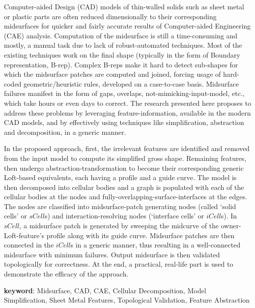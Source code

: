 

Computer-aided Design (CAD) models of thin-walled solids such as sheet metal or plastic parts are often reduced dimensionally to their corresponding midsurfaces for quicker and fairly accurate results of Computer-aided Engineering (CAE) analysis. Computation of the midsurface is still a time-consuming and mostly, a manual task due to lack of robust-automated techniques. Most of the existing techniques work on the final shape (typically in the form of Boundary representation, B-rep). Complex B-reps make it hard to detect sub-shapes for which the midsurface patches are computed and joined, forcing usage of hard-coded geometric/heuristic rules, developed on a case-to-case basis. Midsurface failures manifest in the form of gaps, overlaps, not-mimicking-input-model, etc., which take hours or even days to correct.  The research presented here proposes to address these problems by leveraging feature-information, available in the modern CAD models,         and by effectively using techniques like simplification, abstraction and decomposition, in a generic manner. 

In the proposed approach, first, the irrelevant features are identified and removed from the input model to compute its simplified gross shape. Remaining features, then undergo abstraction-transformation to become their corresponding generic Loft-based equivalents, each having a profile and a guide curve. The model is then decomposed into cellular bodies and a graph is populated with each of the cellular bodies at the nodes and fully-overlapping-surface-interfaces at the edges. The nodes are classified into midsurface-patch generating nodes (called `solid cells' or $sCell$s) and interaction-resolving nodes (`interface cells' or $iCell$s). In $sCell$, a midsurface patch is generated by sweeping the midcurve of the owner-Loft-feature's profile along with its guide curve. Midsurface patches are then connected in the $iCell$s in a generic manner, thus resulting in a well-connected midsurface with minimum failures. Output midsurface is then validated topologically for correctness. At the end, a practical, real-life part is used to demonstrate the efficacy of the approach.

\vspace{0.25cm}

\textbf{keyword}: Midsurface, CAD, CAE, Cellular Decomposition, Model Simplification, Sheet Metal Features, Topological Validation, Feature Abstraction

